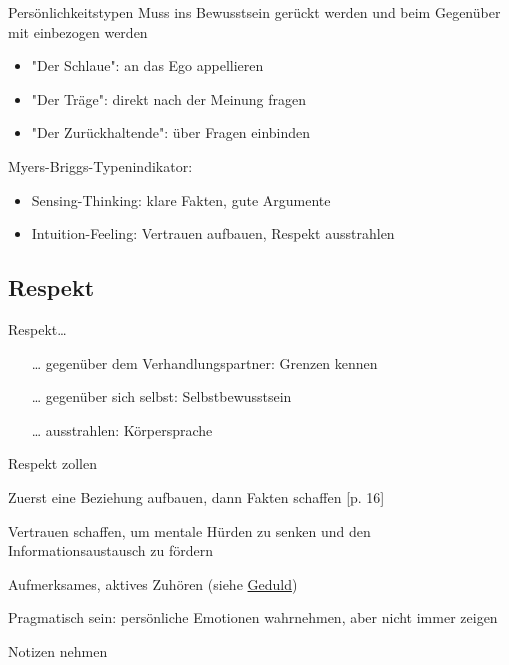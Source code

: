\begin{frame}{Persönlichkeitstypen}
  Muss ins Bewusstsein gerückt werden und beim Gegenüber mit einbezogen werden
	\cite[][4.5.5]{helmold_verhandlungskonzepte_2019}
  \begin{itemize}
	\item "Der Schlaue": an das Ego appellieren
	\item "Der Träge": direkt nach der Meinung fragen
	\item "Der Zurückhaltende": über Fragen einbinden
  \end{itemize}

  Myers-Briggs-Typenindikator:
  \begin{itemize}
	\item Sensing-Thinking: klare Fakten, gute Argumente
	\item Intuition-Feeling: Vertrauen aufbauen, Respekt ausstrahlen
  \end{itemize}
    
\end{frame}


\subsection{Respekt}

\begin{frame}

  Respekt\ldots

  \begin{itemize}
    \item[\ldots]gegenüber dem Verhandlungspartner: Grenzen kennen
    \item[\ldots]gegenüber sich selbst: Selbstbewusstsein
    \item[\ldots]ausstrahlen: Körpersprache
  \end{itemize}

\end{frame}

\begin{frame}{Respekt zollen}

  Zuerst eine Beziehung aufbauen, dann Fakten schaffen \cite{mccarthy_advanced_2015}[p. 16]
  
  Vertrauen schaffen, um mentale Hürden zu senken und den Informationsaustausch zu fördern 

  Aufmerksames, aktives Zuhören (siehe \hyperref[sec:geduld]{Geduld})

  Pragmatisch sein: persönliche Emotionen wahrnehmen, aber nicht immer zeigen

  Notizen nehmen 

\end{frame}

